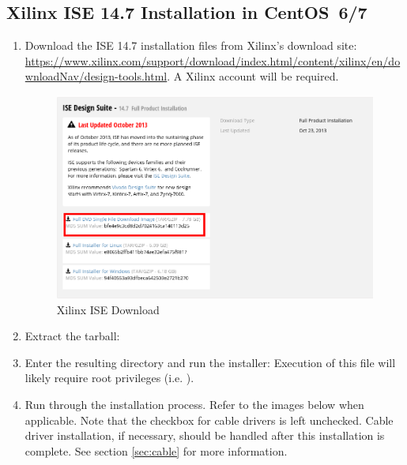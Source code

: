 \begin{flushleft}
\subsection{Xilinx ISE 14.7 Installation in CentOS~6/7}
\label{sec:ise}
\begin{flushleft}
\begin{enumerate}
\item Download the ISE 14.7 installation files from Xilinx's download site:
\url{https://www.xilinx.com/support/download/index.html/content/xilinx/en/downloadNav/design-tools.html}. A Xilinx account will be required.
\begin{figure}[ht]
	\centerline{\includegraphics[scale=0.4]{figures/xilinx_ise_download}}
	\caption{Xilinx ISE Download}
\end{figure}
\item Extract the tarball:\newline
{}
\item Enter the resulting directory and run the installer:\newline
{}\newline
{}\newline
Execution of this file will likely require root privileges (i.e. ).
\pagebreak
\item Run through the installation process. Refer to the images below when applicable. Note that the checkbox for cable drivers is left unchecked. Cable driver installation, if necessary, should be handled after this installation is complete. See section \ref{sec:cable} for more information.
\begin{figure}[H]

\end{figure}
\end{enumerate}
\end{flushleft}
\end{flushleft}

